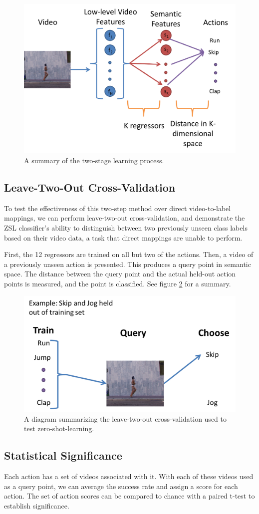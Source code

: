 \documentclass{article}
\begin{document}
\begin{figure}[h]
  \centering
  \includegraphics[width=.4\linewidth]{2stagelearning.png}
  \caption{A summary of the two-stage learning process.}
  \label{2stage}
\end{figure}

\subsection{Leave-Two-Out Cross-Validation}
To test the effectiveness of this two-step method over direct video-to-label mappings, we can perform leave-two-out cross-validation, and demonstrate the ZSL classifier’s ability to distinguish between two previously unseen class labels based on their video data, a task that direct mappings are unable to perform.

First, the 12 regressors are trained on all but two of the actions. Then, a video of a previously unseen action is presented. This produces a query point in semantic space. The distance between the query point and the actual held-out action points is measured, and the point is classified. See figure \ref{ltocv} for a summary.

\begin{figure}[h]
  \centering
  \includegraphics[width = .4\linewidth]{ltocv}
  \caption{A diagram summarizing the leave-two-out cross-validation used to test zero-shot-learning.}
  \label{ltocv}
\end{figure}

\subsection{Statistical Significance}
Each action has a set of videos associated with it. With each of these videos used as a query point, we can average the success rate and assign a score for each action. The set of action scores can be compared to chance with a paired t-test to establish significance.
\end{document}
